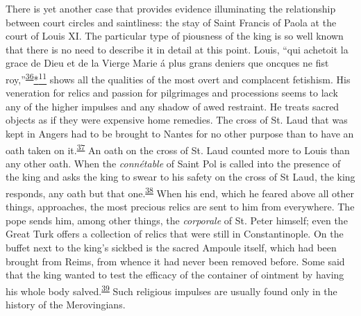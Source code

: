 There is yet another case that provides evidence illuminating the
relationship between court circles and saintliness: the stay of Saint
Francis of Paola at the court of Louis XI. The particular type of
piousness of the king is so well known that there is no need to describe
it in detail at this point. Louis, ``qui achetoit la grace de
\protect\hypertarget{14_Chapter_Seven__THE_PIOUS_PERSONA.xhtmlux5cux23page_215}{}{}Dieu
et de la Vierge Marie á plus grans deniers que oncques ne fist
roy,''\textsuperscript{\protect\hypertarget{14_Chapter_Seven__THE_PIOUS_PERSONA.xhtmlux5cux23id_952}{\protect\hyperlink{23_NOTES.xhtmlux5cux23id_953}{36}}}\protect\hypertarget{14_Chapter_Seven__THE_PIOUS_PERSONA.xhtmlux5cux23id_2561}{\protect\hyperlink{23_NOTES.xhtmlux5cux23id_2562}{*\textsuperscript{11}}}
shows all the qualities of the most overt and complacent fetishism. His
veneration for relics and passion for pilgrimages and processions seems
to lack any of the higher impulses and any shadow of awed restraint. He
treats sacred objects as if they were expensive home remedies. The cross
of St. Laud that was kept in Angers had to be brought to Nantes for no
other purpose than to have an oath taken on
it.\textsuperscript{\protect\hypertarget{14_Chapter_Seven__THE_PIOUS_PERSONA.xhtmlux5cux23id_950}{\protect\hyperlink{23_NOTES.xhtmlux5cux23id_951}{37}}}
An oath on the cross of St. Laud counted more to Louis than any other
oath. When the \emph{connétable} of Saint Pol is called into the
presence of the king and asks the king to swear to his safety on the
cross of St Laud, the king responds, any oath but that
one.\textsuperscript{\protect\hypertarget{14_Chapter_Seven__THE_PIOUS_PERSONA.xhtmlux5cux23id_948}{\protect\hyperlink{23_NOTES.xhtmlux5cux23id_949}{38}}}
When his end, which he feared above all other things, approaches, the
most precious relics are sent to him from everywhere. The pope sends
him, among other things, the \emph{corporale} of St. Peter himself; even
the Great Turk offers a collection of relics that were still in
Constantinople. On the buffet next to the king's sickbed is the sacred
Ampoule itself, which had been brought from Reims, from whence it had
never been removed before. Some said that the king wanted to test the
efficacy of the container of ointment by having his whole body
salved.\textsuperscript{\protect\hypertarget{14_Chapter_Seven__THE_PIOUS_PERSONA.xhtmlux5cux23id_946}{\protect\hyperlink{23_NOTES.xhtmlux5cux23id_947}{39}}}
Such religious impulses are usually found only in the history of the
Merovingians.


